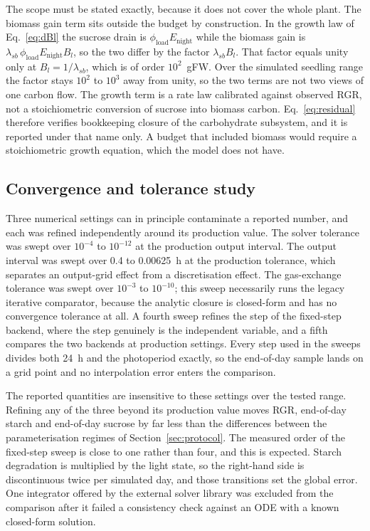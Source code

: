 The scope must be stated exactly, because it does not cover the whole plant.
The biomass gain term sits outside the budget by construction. In the growth law
of Eq.~\eqref{eq:dBl} the sucrose drain is
$\phi_{\text{load}} E_{\text{night}}$ while the biomass gain is
$\lambda_{sb}\,\phi_{\text{load}} E_{\text{night}} B_l$, so the two differ by
the factor $\lambda_{sb} B_l$. That factor equals unity only at
$B_l = 1/\lambda_{sb}$, which is of order $10^{2}$~gFW. Over the simulated
seedling range the factor stays $10^{2}$ to $10^{3}$ away from unity, so the two
terms are not two views of one carbon flow. The growth
term is a rate law calibrated against observed RGR, not a stoichiometric
conversion of sucrose into biomass carbon. Eq.~\eqref{eq:residual} therefore
verifies bookkeeping closure of the carbohydrate subsystem, and it is reported
under that name only. A budget that included biomass would require a
stoichiometric growth equation, which the model does not have.

\subsection{Convergence and tolerance study}

Three numerical settings can in principle contaminate a reported number, and
each was refined independently around its production value. The solver
tolerance was swept over $10^{-4}$ to $10^{-12}$ at the production output
interval. The output interval was swept over 0.4 to 0.00625~h at the production
tolerance, which separates an output-grid effect from a discretisation effect.
The gas-exchange tolerance was swept over $10^{-3}$ to $10^{-10}$; this sweep
necessarily runs the legacy iterative comparator, because the analytic closure
is closed-form and has no convergence tolerance at all. A fourth sweep refines
the step of the fixed-step backend, where the step genuinely is the independent
variable, and a fifth compares the two backends at production settings. Every
step used in the sweeps divides both 24~h and the photoperiod exactly, so the
end-of-day sample lands on a grid point and no interpolation error enters the
comparison.

The reported quantities are insensitive to these settings over the tested range.
Refining any of the three beyond its production value moves RGR, end-of-day
starch and end-of-day sucrose by far less than the differences between the
parameterisation regimes of Section~\ref{sec:protocol}. The
measured order of the fixed-step sweep is close to one rather than four, and
this is expected. Starch degradation is multiplied by the light state, so the
right-hand side is discontinuous twice per simulated day, and those transitions
set the global error. One integrator offered by the external solver library
was excluded from the comparison after it failed a consistency check against an
ODE with a known closed-form solution.

